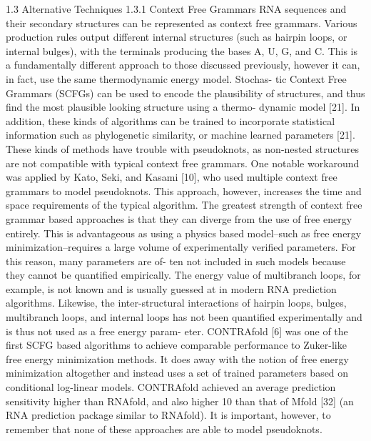 \documentclass{cshonours}
\begin{document}
1.3 Alternative Techniques
1.3.1 Context Free Grammars
RNA sequences and their secondary structures can be represented as context free
grammars. Various production rules output different internal structures (such as
hairpin loops, or internal bulges), with the terminals producing the bases A, U, G,
and C. This is a fundamentally different approach to those discussed previously,
however it can, in fact, use the same thermodynamic energy model. Stochas-
tic Context Free Grammars (SCFGs) can be used to encode the plausibility of
structures, and thus find the most plausible looking structure using a thermo-
dynamic model [21]. In addition, these kinds of algorithms can be trained to
incorporate statistical information such as phylogenetic similarity, or machine
learned parameters [21]. These kinds of methods have trouble with pseudoknots,
as non-nested structures are not compatible with typical context free grammars.
One notable workaround was applied by Kato, Seki, and Kasami [10], who used
multiple context free grammars to model pseudoknots. This approach, however,
increases the time and space requirements of the typical algorithm.
The greatest strength of context free grammar based approaches is that they
can diverge from the use of free energy entirely. This is advantageous as using
a physics based model–such as free energy minimization–requires a large volume
of experimentally verified parameters. For this reason, many parameters are of-
ten not included in such models because they cannot be quantified empirically.
The energy value of multibranch loops, for example, is not known and is usually
guessed at in modern RNA prediction algorithms. Likewise, the inter-structural
interactions of hairpin loops, bulges, multibranch loops, and internal loops has
not been quantified experimentally and is thus not used as a free energy param-
eter. CONTRAfold [6] was one of the first SCFG based algorithms to achieve
comparable performance to Zuker-like free energy minimization methods. It does
away with the notion of free energy minimization altogether and instead uses a
set of trained parameters based on conditional log-linear models. CONTRAfold
achieved an average prediction sensitivity higher than RNAfold, and also higher
10
than that of Mfold [32] (an RNA prediction package similar to RNAfold). It
is important, however, to remember that none of these approaches are able to
model pseudoknots.
\end{document}
